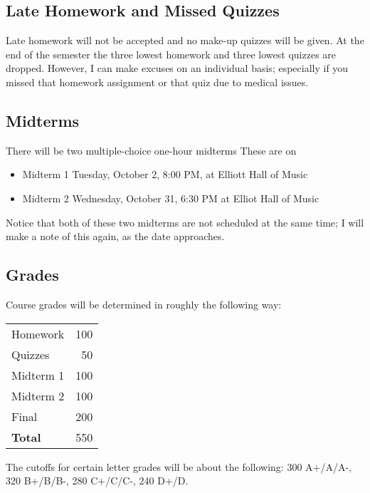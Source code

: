 \documentclass[12pt,letterpaper]{article}
\begin{document}
\subsection{Late Homework and Missed Quizzes}
\label{sec:org52bce11}
Late homework will not be accepted and no make-up quizzes will be given. At
the end of the semester the three lowest homework and three lowest quizzes
are dropped. However, I can make excuses on an individual basis; especially
if you missed that homework assignment or that quiz due to medical issues. 

\subsection{Midterms}
\label{sec:org8029e8d}
There will be two multiple-choice one-hour midterms These are on
\begin{itemize}
\item Midterm 1 Tuesday, October 2, 8:00 PM, at Elliott Hall of Music
\item Midterm 2 Wednesday, October 31, 6:30 PM at Elliot Hall of Music
\end{itemize}

Notice that both of these two midterms are not scheduled at the same time; I
will make a note of this again, as the date approaches.

\subsection{Grades}
\label{sec:org06c1682}
Course grades will be determined in roughly the following way:
\begin{center}
\begin{tabular}{lr}
Homework & 100\\
Quizzes & 50\\
Midterm 1 & 100\\
Midterm 2 & 100\\
Final & 200\\
\hline
\textbf{Total} & 550\\
\end{tabular}
\end{center}

The cutoffs for certain letter grades will be about the following: 300
A+/A/A-, 320 B+/B/B-, 280 C+/C/C-, 240 D+/D.
\end{document}
